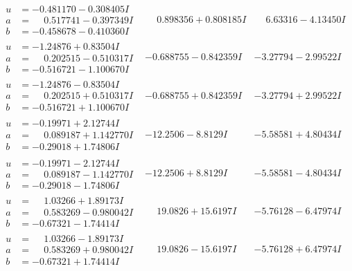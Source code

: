 \documentclass[1p]{elsarticle_modified}
\theoremstyle{definition}
\begin{document}
$$\begin{array}{c|c|c}
\begin{aligned}
u &= -0.481170 - 0.308405 I \\
a &= \phantom{-}0.517741 - 0.397349 I \\
b &= -0.458678 - 0.410360 I\end{aligned}
 & \phantom{-}0.898356 + 0.808185 I & \phantom{-}6.63316 - 4.13450 I \\ \hline\begin{aligned}
u &= -1.24876 + 0.83504 I \\
a &= \phantom{-}0.202515 - 0.510317 I \\
b &= -0.516721 - 1.100670 I\end{aligned}
 & -0.688755 - 0.842359 I & -3.27794 - 2.99522 I \\ \hline\begin{aligned}
u &= -1.24876 - 0.83504 I \\
a &= \phantom{-}0.202515 + 0.510317 I \\
b &= -0.516721 + 1.100670 I\end{aligned}
 & -0.688755 + 0.842359 I & -3.27794 + 2.99522 I \\ \hline\begin{aligned}
u &= -0.19971 + 2.12744 I \\
a &= \phantom{-}0.089187 + 1.142770 I \\
b &= -0.29018 + 1.74806 I\end{aligned}
 & -12.2506 - 8.8129 I & -5.58581 + 4.80434 I \\ \hline\begin{aligned}
u &= -0.19971 - 2.12744 I \\
a &= \phantom{-}0.089187 - 1.142770 I \\
b &= -0.29018 - 1.74806 I\end{aligned}
 & -12.2506 + 8.8129 I & -5.58581 - 4.80434 I \\ \hline\begin{aligned}
u &= \phantom{-}1.03266 + 1.89173 I \\
a &= \phantom{-}0.583269 - 0.980042 I \\
b &= -0.67321 - 1.74414 I\end{aligned}
 & \phantom{-}19.0826 + 15.6197 I & -5.76128 - 6.47974 I \\ \hline\begin{aligned}
u &= \phantom{-}1.03266 - 1.89173 I \\
a &= \phantom{-}0.583269 + 0.980042 I \\
b &= -0.67321 + 1.74414 I\end{aligned}
 & \phantom{-}19.0826 - 15.6197 I & -5.76128 + 6.47974 I \\ \hline\begin{aligned}

\end{aligned}
\end{array}$$
\end{document}
